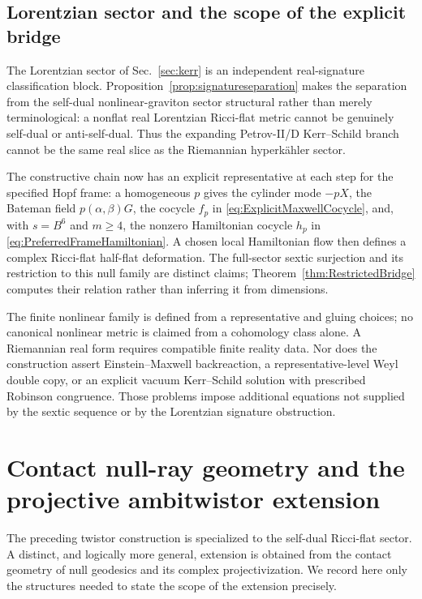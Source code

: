 \documentclass[aps,prd,reprint,nofootinbib,superscriptaddress]{revtex4-2}
\theoremstyle{definition}
\theoremstyle{remark}
\begin{document}
\subsection{Lorentzian sector and the scope of the explicit bridge}

The Lorentzian sector of Sec.~\ref{sec:kerr} is an independent real-signature classification block.  Proposition~\ref{prop:signatureseparation} makes the separation from the self-dual nonlinear-graviton sector structural rather than merely terminological: a nonflat real Lorentzian Ricci-flat metric cannot be genuinely self-dual or anti-self-dual.  Thus the expanding Petrov-II/D Kerr--Schild branch cannot be the same real slice as the Riemannian hyperk\"ahler sector.

The constructive chain now has an explicit representative at each step for the specified Hopf frame: a homogeneous $p$ gives the cylinder mode $-pX$, the Bateman field $p(\alpha,\beta)G$, the cocycle $f_p$ in \eqref{eq:ExplicitMaxwellCocycle}, and, with $s=B^6$ and $m\ge4$, the nonzero Hamiltonian cocycle $h_p$ in \eqref{eq:PreferredFrameHamiltonian}. A chosen local Hamiltonian flow then defines a complex Ricci-flat half-flat deformation. The full-sector sextic surjection and its restriction to this null family are distinct claims; Theorem~\ref{thm:RestrictedBridge} computes their relation rather than inferring it from dimensions.

The finite nonlinear family is defined from a representative and gluing choices; no canonical nonlinear metric is claimed from a cohomology class alone. A Riemannian real form requires compatible finite reality data. Nor does the construction assert Einstein--Maxwell backreaction, a representative-level Weyl double copy, or an explicit vacuum Kerr--Schild solution with prescribed Robinson congruence. Those problems impose additional equations not supplied by the sextic sequence or by the Lorentzian signature obstruction.

\section{Contact null-ray geometry and the projective ambitwistor extension}
\label{sec:ambitwistor}

The preceding twistor construction is specialized to the self-dual Ricci-flat sector.  A distinct, and logically more general, extension is obtained from the contact geometry of null geodesics and its complex projectivization.  We record here only the structures needed to state the scope of the extension precisely.
\end{document}
